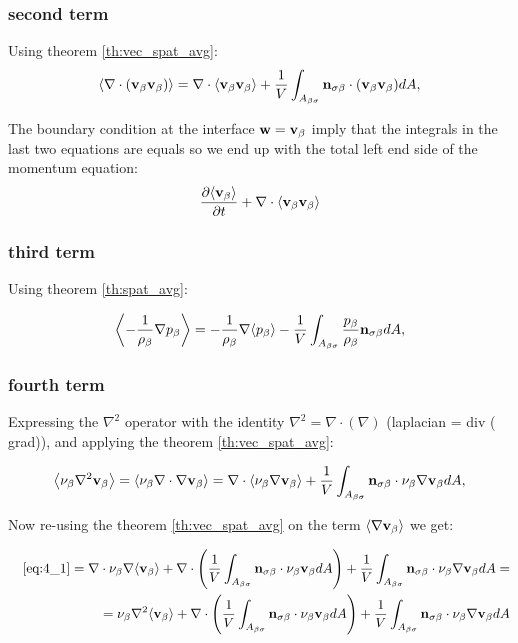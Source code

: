 \subsubsection{second term}

Using theorem \ref{th:vec_spat_avg}:
\begin{equation}
{\left< \nabla \cdot (\textbf{v}_{\beta}\textbf{v}_{\beta}) \right>} = \nabla \cdot {\left< \textbf{v}_{\beta}\textbf{v}_{\beta}\right>} + \dfrac{1}{V} \int_{A_{\beta \sigma}} \mathbf{n}_{\sigma \beta} \cdot (\textbf{v}_{\beta} \textbf{v}_{\beta}) dA,
\end{equation}


The boundary condition at the interface $\mathbf{w} = \textbf{v}_{\beta}$ imply that the integrals in the last two equations are equals so we end up with the total left end side of the momentum equation:
$$
\frac{\partial {\left< \textbf{v}_{\beta}\right>}}{\partial t} + \nabla \cdot {\left< \textbf{v}_{\beta}\textbf{v}_{\beta}\right>}
$$

\subsubsection{third term}

Using theorem \ref{th:spat_avg}:

\begin{equation}
{\left< -\dfrac{1}{\rho_{\beta}} \nabla p_{\beta}\right>} = -\dfrac{1}{\rho_{\beta}} \nabla {\left< p_{\beta}\right>} -\dfrac{1}{V} \int_{A_{\beta \sigma}} \dfrac{p_{\beta}}{\rho_{\beta}} \mathbf{n}_{\sigma \beta} dA,
\end{equation}

\subsubsection{fourth term}
Expressing the $\nabla^2$ operator with the identity $\nabla^2 = \nabla \cdot (\nabla)$ (laplacian = div ( grad)), and applying the theorem \ref{th:vec_spat_avg}:


\begin{equation}
{\left< \nu_{\beta}\nabla^2 \textbf{v}_{\beta}\right>} = {\left< \nu_{\beta}\nabla \cdot \nabla \textbf{v}_{\beta} \right>} = \nabla \cdot {\left< \nu_{\beta}\nabla \textbf{v}_{\beta}\right>} +\dfrac{1}{V} \int_{A_{\beta \sigma}} \mathbf{n}_{\sigma \beta} \cdot \nu_{\beta} \nabla \textbf{v}_{\beta} dA,
	\label{eq:4_1}
\end{equation}

Now re-using the theorem \ref{th:vec_spat_avg} on the term ${\left< \nabla \textbf{v}_{\beta} \right>}$ we get:

\begin{eqnarray}
	&&\eqref{eq:4_1} = \nabla \cdot \nu_{\beta} \nabla {\left< \textbf{v}_{\beta}\right>} + \nabla \cdot \left( \dfrac{1}{V} \int_{A_{\beta \sigma}} \mathbf{n}_{\sigma \beta} \cdot \nu_{\beta} \textbf{v}_{\beta} dA \right) + \dfrac{1}{V} \int_{A_{\beta \sigma}} \mathbf{n}_{\sigma \beta} \cdot \nu_{\beta} \nabla \textbf{v}_{\beta} dA = \nonumber \\
	&& = \nu_{\beta}\nabla^2 {\left< \textbf{v}_{\beta} \right>} +  \nabla \cdot \left( \dfrac{1}{V} \int_{A_{\beta \sigma}} \mathbf{n}_{\sigma \beta} \cdot \nu_{\beta} \textbf{v}_{\beta} dA \right) + \dfrac{1}{V} \int_{A_{\beta \sigma}} \mathbf{n}_{\sigma \beta} \cdot \nu_{\beta} \nabla \textbf{v}_{\beta} dA
\end{eqnarray}

